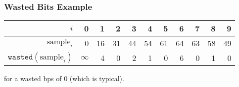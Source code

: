 \subsubsection{Wasted Bits Example}
\begin{table}[h]
{
\begin{tabular}{r|rrrrrrrrrr}
$i$ & 0 & 1 & 2 & 3 & 4 & 5 & 6 & 7 & 8 & 9 \\
\hline
$\text{sample}_i$ & 0 & 16 & 31 & 44 & 54 & 61 & 64 & 63 & 58 & 49 \\
$\texttt{wasted}(\text{sample}_i)$ & $\infty$ & 4 & 0 & 2 & 1 & 0 & 6 & 0 & 1 & 0 \\
\end{tabular}
}
\end{table}
\par
\noindent
for a wasted bps of 0 (which is typical).

